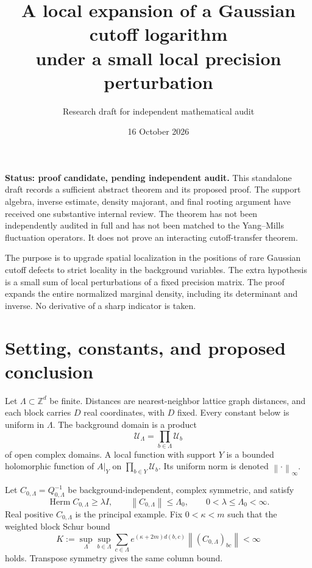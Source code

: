 \documentclass[11pt]{article}
\title{A local expansion of a Gaussian cutoff logarithm\\
under a small local precision perturbation}
\author{Research draft for independent mathematical audit}
\date{16 October 2026}
\newcommand{\Herm}{\operatorname{Herm}}
\newcommand{\Z}{\mathbb Z}
\newcommand{\norm}[1]{\left\|#1\right\|}
\begin{document}
\maketitle

\noindent\textbf{Status: proof candidate, pending independent audit.}
This standalone draft records a sufficient abstract theorem and its proposed
proof. The support algebra, inverse estimate, density majorant, and final
rooting argument have received one substantive internal review. The theorem
has not been independently audited in full and has not been matched to the
Yang--Mills fluctuation operators. It does not prove an interacting
cutoff-transfer theorem.

\medskip
\noindent
The purpose is to upgrade spatial localization in the positions of rare
Gaussian cutoff defects to strict locality in the background variables.
The extra hypothesis is a small sum of local perturbations of a fixed
precision matrix. The proof expands the entire normalized marginal density,
including its determinant and inverse. No derivative of a sharp indicator
is taken.

\section{Setting, constants, and proposed conclusion}

Let $\Lambda\subset\Z^d$ be finite. Distances are nearest-neighbor lattice
graph distances, and each block carries $D$ real coordinates, with $D$ fixed.
Every constant below is uniform in $\Lambda$. The background domain is a
product
\[
 \mathcal U_\Lambda=\prod_{b\in\Lambda}\mathcal U_b
\]
of open complex domains. A local function with support $Y$ is a bounded
holomorphic function of $A|_Y$ on $\prod_{b\in Y}\mathcal U_b$.
Its uniform norm is denoted $\norm{\cdot}_\infty$.

Let $C_{0,\Lambda}=Q_{0,\Lambda}^{-1}$ be background-independent, complex
symmetric, and satisfy
\begin{equation}
 \Herm C_{0,\Lambda}\ge\lambda I,\qquad
 \norm{C_{0,\Lambda}}\le\Lambda_0,
 \qquad 0<\lambda\le\Lambda_0<\infty.
 \label{eq:baseline-gap}
\end{equation}
Real positive $C_{0,\Lambda}$ is the principal example. Fix $0<\kappa<m$
such that the weighted block Schur bound
\begin{equation}
 K:=\sup_\Lambda\sup_{b\in\Lambda}
       \sum_{c\in\Lambda}
       e^{(\kappa+2m)d(b,c)}\norm{(C_{0,\Lambda})_{bc}}
       <\infty
 \label{eq:baseline-decay}
\end{equation}
holds. Transpose symmetry gives the same column bound.
\end{document}
